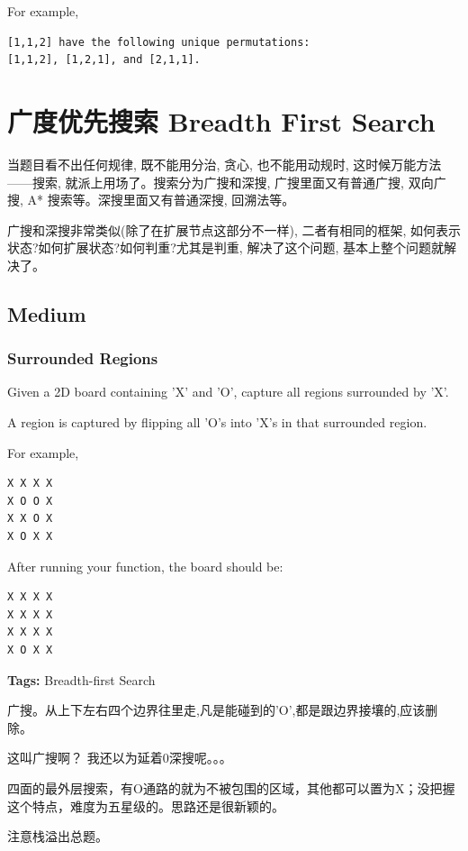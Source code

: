 \documentclass[12pt]{book}
\begin{document}
For example,
\lstset{language=java,label= ,caption= ,numbers=none}
\begin{lstlisting}
[1,1,2] have the following unique permutations:
[1,1,2], [1,2,1], and [2,1,1].
\end{lstlisting}
\chapter{广度优先搜索 Breadth First Search}
\label{sec-10}
当题目看不出任何规律, 既不能用分治, 贪心, 也不能用动规时, 这时候万能方法——搜索, 就派上用场了。搜索分为广搜和深搜, 广搜里面又有普通广搜, 双向广搜, A* 搜索等。深搜里面又有普通深搜, 回溯法等。

广搜和深搜非常类似(除了在扩展节点这部分不一样), 二者有相同的框架, 如何表示状态?如何扩展状态?如何判重?尤其是判重, 解决了这个问题, 基本上整个问题就解决了。
\section{Medium}
\label{sec-10-1}
\subsection{Surrounded Regions}
\label{sec-10-1-1}
Given a 2D board containing 'X' and 'O', capture all regions surrounded by 'X'.

A region is captured by flipping all 'O's into 'X's in that surrounded region.

For example,
\lstset{language=java,label= ,caption= ,numbers=none}
\begin{lstlisting}
X X X X
X O O X
X X O X
X O X X
\end{lstlisting}

After running your function, the board should be:
\lstset{language=java,label= ,caption= ,numbers=none}
\begin{lstlisting}
X X X X
X X X X
X X X X
X O X X
\end{lstlisting}

\textbf{Tags:} Breadth-first Search

广搜。从上下左右四个边界往里走,凡是能碰到的'O',都是跟边界接壤的,应该删
除。

这叫广搜啊？ 我还以为延着0深搜呢。。。

四面的最外层搜索，有O通路的就为不被包围的区域，其他都可以置为X；没把握
这个特点，难度为五星级的。思路还是很新颖的。

注意栈溢出总题。
\end{document}
